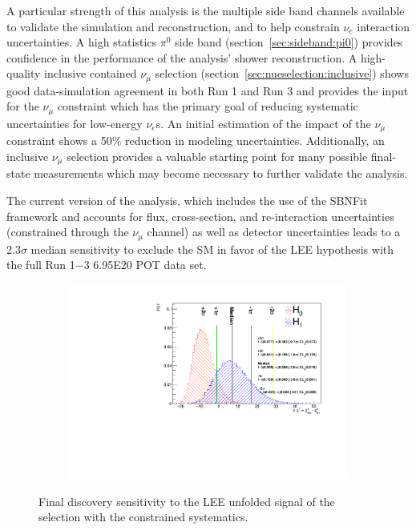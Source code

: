 \par A particular strength of this analysis is the multiple side band channels available to validate the simulation and reconstruction, and to help constrain $\nu_e$ interaction uncertainties. A high statistics $\pi^0$ side band (section~\ref{sec:sideband:pi0}) provides confidence in the performance of the analysis' shower reconstruction. A high-quality inclusive contained $\nu_{\mu}$ selection (section~\ref{sec:nueselection:inclusive}) shows good data-simulation agreement in both Run 1 and Run 3 and provides the input for the $\nu_{\mu}$ constraint which has the primary goal of reducing systematic uncertainties for low-energy $\nu_e$s. An initial estimation of the impact of the $\nu_{\mu}$ constraint shows a 50\% reduction in modeling uncertainties. Additionally, an inclusive $\nu_{\mu}$ selection provides a valuable starting point for many possible final-state measurements which may become necessary to further validate the analysis. 
\par The current version of the analysis, which includes the use of the SBNFit framework and accounts for flux, cross-section, and re-interaction uncertainties (constrained through the $\nu_{\mu}$ channel) as well as detector uncertainties leads to a 2.3$\sigma$ median sensitivity to exclude the SM in favor of the LEE hypothesis with the full Run 1$-$3 6.95E20 POT data set. 
\begin{figure}[H]
    \begin{center}
    \begin{subfigure}{0.55\textwidth}
    \includegraphics[width=1.00\textwidth]{Sensitivity/BDT_higheff/SBNfit_Cls_nue_1e0p_numu_reco_e_H1_newBDT_higheff_noCCMEC_constrained_detsys.pdf}
    \label{fig:sensitivity_bdt_loose_const:intro}
    \end{subfigure}
    \caption{Final discovery sensitivity to the LEE unfolded signal of the \npsel selection with the constrained systematics.}
    \end{center}
\end{figure}

